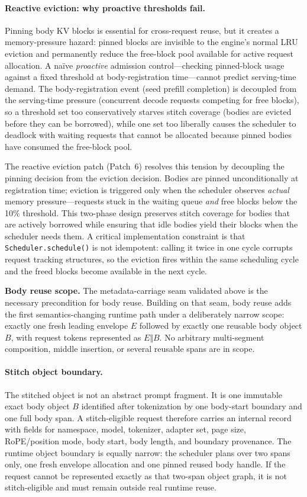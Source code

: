 \documentclass[conference]{IEEEtran}
\begin{document}
\paragraph{Reactive eviction: why proactive thresholds fail.}
Pinning body KV blocks is essential for cross-request reuse, but it creates a memory-pressure hazard: pinned blocks are invisible to the engine's normal LRU eviction and permanently reduce the free-block pool available for active request allocation. A na\"ive \emph{proactive} admission control---checking pinned-block usage against a fixed threshold at body-registration time---cannot predict serving-time demand. The body-registration event (seed prefill completion) is decoupled from the serving-time pressure (concurrent decode requests competing for free blocks), so a threshold set too conservatively starves stitch coverage (bodies are evicted before they can be borrowed), while one set too liberally causes the scheduler to deadlock with waiting requests that cannot be allocated because pinned bodies have consumed the free-block pool.

The reactive eviction patch (Patch~6) resolves this tension by decoupling the pinning decision from the eviction decision. Bodies are pinned unconditionally at registration time; eviction is triggered only when the scheduler observes \emph{actual} memory pressure---requests stuck in the waiting queue \emph{and} free blocks below the 10\% threshold. This two-phase design preserves stitch coverage for bodies that are actively borrowed while ensuring that idle bodies yield their blocks when the scheduler needs them. A critical implementation constraint is that \texttt{Scheduler.schedule()} is not idempotent: calling it twice in one cycle corrupts request tracking structures, so the eviction fires within the same scheduling cycle and the freed blocks become available in the next cycle.

\textbf{Body reuse scope.} The metadata-carriage seam validated above is the necessary precondition for body reuse. Building on that seam, body reuse adds the first semantics-changing runtime path under a deliberately narrow scope: exactly one fresh leading envelope $E$ followed by exactly one reusable body object $B$, with request tokens represented as $E \Vert B$. No arbitrary multi-segment composition, middle insertion, or several reusable spans are in scope.

\paragraph{Stitch object boundary.}
The stitched object is not an abstract prompt fragment. It is one immutable exact body object $B$ identified after tokenization by one body-start boundary and one full body span. A stitch-eligible request therefore carries an internal record with fields for namespace, model, tokenizer, adapter set, page size, RoPE/position mode, body start, body length, and boundary provenance. The runtime object boundary is equally narrow: the scheduler plans over two spans only, one fresh envelope allocation and one pinned reused body handle. If the request cannot be represented exactly as that two-span object graph, it is not stitch-eligible and must remain outside real runtime reuse.
\end{document}

